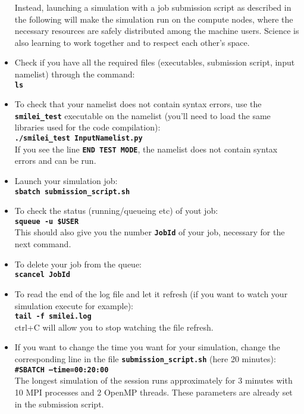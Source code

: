 \documentclass{article}
\newcommand{\commandline}[1]{\texttt{\textbf{#1}}}
\begin{document}
\begin{itemize}
Instead, launching a simulation with a job submission script as described in the following will make the simulation run on the compute nodes, where the necessary resources are safely distributed among the machine users.  Science is also learning to work together and to respect each other's space.\\

\item Check if you have all the required files (executables, submission script, input namelist) through the command:\\
\commandline{ls}

\item To check that your namelist does not contain syntax errors, use the \commandline{smilei\_test} executable on the namelist (you'll need to load the same libraries used for the code compilation):\\
\commandline{./smilei\_test InputNamelist.py}\\
If you see the line \commandline{END TEST MODE}, the namelist does not contain syntax errors and can be run.

\item Launch your simulation job:\\
\commandline{sbatch submission\_script.sh}

\item To check the status (running/queueing etc) of yout job:\\
\commandline{squeue -u \$USER}\\
This should also give you the number \commandline{JobId} of your job, necessary for the next command.

\item To delete your job from the queue:\\
\commandline{scancel JobId}

\item To read the end of the log file and let it refresh (if you want to watch your simulation execute for example):\\
\commandline{tail -f smilei.log}\\
ctrl+C will allow you to stop watching the file refresh.

\item If you want to change the time you want for your simulation, change the corresponding line in the file \commandline{submission\_script.sh} (here 20 minutes):\\
\commandline{\#SBATCH --time=00:20:00}\\
The longest simulation of the session runs approximately for 3 minutes with 10 MPI processes and 2 OpenMP threads. These parameters are already set in the submission script.


\end{itemize}
\end{document}
